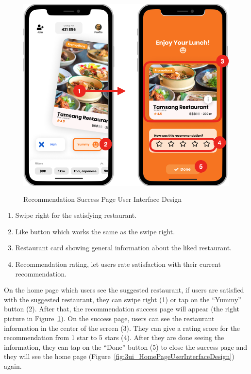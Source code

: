 \documentclass[12pt,oneside,openright,a4paper]{cpe-english-project}
\begin{document}
\newpage
\begin{figure}[H]\centering
\includegraphics[height=300pt]{./images/3ui_RecommendationSuccessPageUserInterfaceDesign.png}
\caption{Recommendation Success Page User Interface Design}\label{fig:3ui_RecommendationSuccessPageUserInterfaceDesign}
\end{figure}\vspace{-24pt}

\begin{enumerate}
\item Swipe right for the satisfying restaurant.
\item Like button which works the same as the swipe right.
\item Restaurant card showing general information about the liked restaurant.
\item Recommendation rating, let users rate satisfaction with their current recommendation.
\end{enumerate}

On the home page which users see the suggested restaurant, if users are satisfied with the suggested restaurant, they can swipe right (1) or tap on the “Yummy” button (2). After that, the recommendation success page will appear (the right picture in Figure~\ref{fig:3ui_RecommendationSuccessPageUserInterfaceDesign}). On the success page, users can see the restaurant information in the center of the screen (3). They can give a rating score for the recommendation from 1 star to 5 stars (4). After they are done seeing the information, they can tap on the “Done” button (5) to close the success page and they will see the home page (Figure~\ref{fig:3ui_HomePageUserInterfaceDesign}) again.
\end{document}
